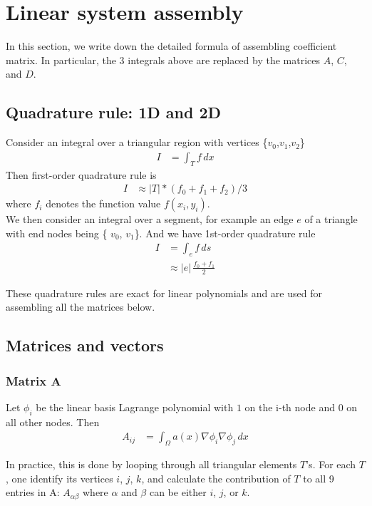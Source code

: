 \documentclass{article}
\begin{document}
 \section{Linear system assembly}
 In this section, we write down the detailed formula of assembling coefficient matrix. In particular, the 3 integrals 
 above are replaced by the matrices $A$, $C$, and $D$.

 \subsection{Quadrature rule: 1D and 2D}
 Consider an integral over a triangular region with vertices \{$v_0$,$v_1$,$v_2$\}
 \begin{align}
  I &=\int_T f\,dx
 \end{align}
 Then first-order quadrature rule is
 \begin{align}
  I &\approx |T| * (f_0 + f_1 + f_2) / 3
 \end{align}
 where $f_i$ denotes the function value $f(x_i, y_i)$.\\
 
 We then consider an integral over a segment, for example an edge $e$ of a triangle with end nodes being \{ $v_0$, 
 $v_1$\}. And we have 1st-order quadrature rule
 \begin{align}
  I &= \int_e f \, ds\\
   &\approx |e|\, \frac{f_0 + f_1}{2}
  \end{align}

 These quadrature rules are exact for linear polynomials and are used for assembling all the matrices below.

 \subsection{Matrices and vectors}
 \subsubsection{Matrix A}
 Let $\phi_i$ be the linear basis Lagrange polynomial with $1$ on the i-th node and $0$ on all other nodes. Then
 \begin{align}
  A_{ij} &= \int_\Omega a(x)\nabla \phi_i \nabla\phi_j \, dx
 \end{align}
 
 In practice, this is done by looping through all triangular elements $T$'s. For each $T$, one identify its vertices 
 $i$, $j$, $k$, and calculate the contribution of $T$ to all 9 entries in A: $A_{\alpha \beta}$ where $\alpha$ and 
 $\beta$ can be either $i$, $j$, or $k$.\\
 
\end{document}
